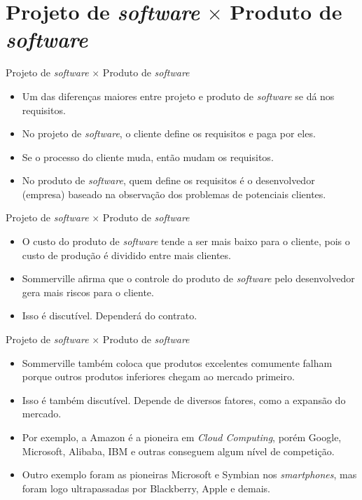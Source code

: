 \documentclass[11pt]{beamer}
\begin{document}
   \section{Projeto de \textit{software} $\times$ Produto de \textit{software}}

   \begin{frame}{Projeto de \textit{software} $\times$ Produto de \textit{software}}
      \begin{itemize}
         \item Um das diferenças maiores entre projeto e produto de \textit{software} se dá nos requisitos.
         \item No projeto de \textit{software}, o cliente define os requisitos e paga por eles.
         \item Se o processo do cliente muda, então mudam os requisitos.
         \item No produto de \textit{software}, quem define os requisitos é o desenvolvedor (empresa) baseado na observação dos problemas de potenciais clientes.      
      \end{itemize}
   \end{frame}

   \begin{frame}{Projeto de \textit{software} $\times$ Produto de \textit{software}}
      \begin{itemize}
         \item O custo do produto de \textit{software} tende a ser mais baixo para o cliente, pois o custo de produção é dividido entre mais clientes.
         \item Sommerville afirma que o controle do produto de \textit{software} pelo desenvolvedor gera mais riscos para o cliente.
         \item Isso é discutível. Dependerá do contrato.
      \end{itemize}
   \end{frame}

   \begin{frame}{Projeto de \textit{software} $\times$ Produto de \textit{software}}
      \begin{itemize}
         \item Sommerville também coloca que produtos excelentes comumente falham porque outros produtos inferiores chegam ao mercado primeiro.
         \item Isso é também discutível. Depende de diversos fatores, como a expansão do mercado.
         \item Por exemplo, a Amazon é a pioneira em \textit{Cloud Computing}, porém Google, Microsoft, Alibaba, IBM e outras conseguem algum nível de competição.
         \item Outro exemplo foram as pioneiras Microsoft e Symbian nos \textit{smartphones}, mas foram logo ultrapassadas por Blackberry, Apple e demais.
      \end{itemize}
   \end{frame}
\end{document}
